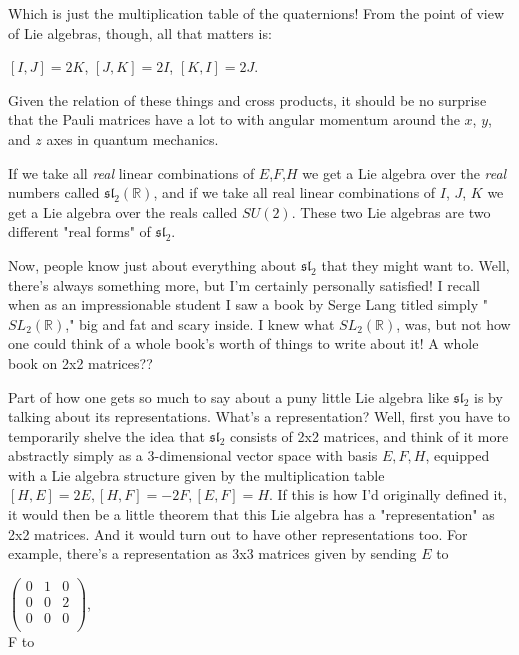 Which is just the multiplication table of the quaternions! From the point of view of Lie algebras, though, all that matters is:

$[I,J] = 2K$,    $[J,K] = 2I$,    $[K,I] = 2J$.

Given the relation of these things and cross products, it should be no surprise that the Pauli matrices have a lot to with angular momentum around the $x$, $y$, and $z$ axes in quantum mechanics.

If we take all \textit{real} linear combinations of $E$,$F$,$H$ we get a Lie algebra over the \textit{real} numbers called $\mathfrak{sl}_2(\mathbb{R})$, and if we take all real linear combinations of $I$, $J$, $K$ we get a Lie algebra over the reals called $SU(2)$. These two Lie algebras are two different "real forms" of $\mathfrak{sl}_2$.

Now, people know just about everything about $\mathfrak{sl}_2$ that they might want to. Well, there's always something more, but I'm certainly personally satisfied! I recall when as an impressionable student I saw a book by Serge Lang titled simply "$SL_2(\mathbb{R})$," big and fat and scary inside. 
I knew what $SL_2(\mathbb{R})$, was, but not how one could think of a whole book's worth of things to write about it! A whole book on 2x2 matrices??

Part of how one gets so much to say about a puny little Lie algebra like $\mathfrak{sl}_2$ is by talking about its representations. What's a representation? Well, first you have to temporarily shelve the idea that $\mathfrak{sl}_2$ consists of 2x2 matrices, and think of it more abstractly simply as a 3-dimensional vector space with basis $E,F,H$, equipped with a Lie algebra structure given by the multiplication table $[H,E] = 2E, [H,F] = -2F, [E,F] = H$. If this is how I'd originally defined it, it would then be a little theorem that this Lie algebra has a "representation" as 2x2 matrices. And it would turn out to have other representations too. For example, there's a representation as 3x3 matrices given by sending $E$ to

$\begin{pmatrix}
0 & 1 & 0 \\
0 & 0 & 2 \\
0 & 0 & 0 \\
\end{pmatrix}$,
\\



F to
\\

